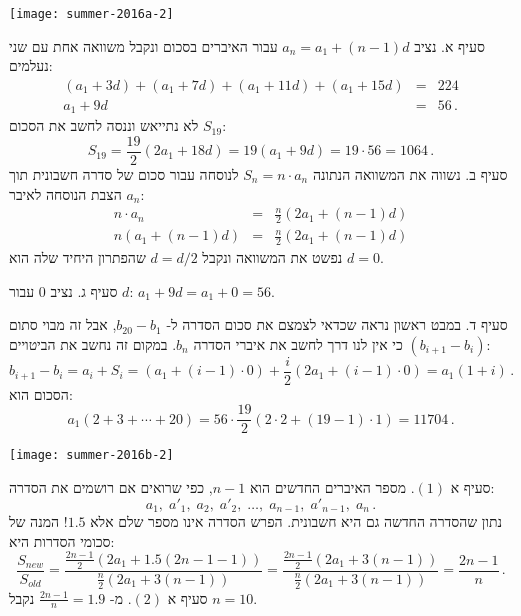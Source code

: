 \begin{center}
\texttt{[image: summer-2016a-2]}
\end{center}
\vspace{-2ex}
סעיף א. נציב
$a_n=a_1+(n-1)d$
עבור האיברים בסכום ונקבל משוואה אחת עם שני נעלמים:
\begin{eqnarray*}
(a_1+3d)+(a_1+7d)+(a_1+11d)+(a_1+15d)&=&224\\
a_1+9d&=&56\,.
\end{eqnarray*}
לא נתייאש וננסה לחשב את הסכום
$S_{19}$:
\[
S_{19}=\frac{19}{2}(2a_1+18d) = 19(a_1+9d)=19\cdot 56 = 1064\,.
\]
סעיף ב. נשווה את המשוואה הנתונה
$S_n=n\cdot a_n$
לנוסחה עבור סכום של סדרה חשבונית תוך הצבת הנוסחה לאיבר
$a_n$:
\begin{eqnarray*}
n\cdot a_n &=& \frac{n}{2}(2a_1+(n-1)d)\\
n(a_1+(n-1)d) &=&\frac{n}{2}(2a_1+(n-1)d)
\end{eqnarray*}
נפשט את המשוואה ונקבל 
$d=d/2$
שהפתרון היחיד שלה הוא
$d=0$.

סעיף ג. נציב
$0$
עבור 
$d$:
$a_1+9d=a_1+0=56$.

סעיף ד. במבט ראשון נראה שכדאי לצמצם את סכום הסדרה  ל-%
$b_{20}-b_1$,
אבל זה מבוי סתום כי אין לנו דרך לחשב את איברי הסדרה
$b_n$.
במקום זה נחשב את הביטויים
$(b_{i+1}-b_i)$:
\[
b_{i+1}-b_i=a_i+S_i=(a_1+(i-1)\cdot 0)+\frac{i}{2}(2a_1+(i-1)\cdot 0)=a_1(1+i)\,.
\]
הסכום הוא:
\[
a_1(2+3+\cdots+20)=56\cdot\frac{19}{2}(2\cdot 2 + (19-1)\cdot 1)=11704\,.
\]
\vspace{-4ex}


\bigskip

\textbf{}

\begin{center}
\texttt{[image: summer-2016b-2]}
\end{center}
\vspace{-1ex}
סעיף א
$(1)$.
מספר האיברים החדשים הוא
$n-1$,
כפי שרואים אם רושמים את הסדרה:
\[
a_1,\; a'_1,\; a_2,\; a'_2,\; \ldots,\; a_{n-1},\; a'_{n-1},\; a_n\,.
\]
נתון שהסדרה החדשה גם היא חשבונית. הפרש הסדרה אינו מספר שלם אלא
$1.5$!
המנה של סכומי הסדרות היא:
\[
\frac{S_{\mathit{new}}}{S_{\mathit{old}}}= \frac{\displaystyle\frac{2n-1}{2}(2a_1+1.5(2n-1-1))}{\displaystyle\frac{n}{2}(2a_1+3(n-1))}=\frac{\displaystyle\frac{2n-1}{2}(2a_1+3(n-1))}{\displaystyle\frac{n}{2}(2a_1+3(n-1))}=\frac{2n-1}{n}\,.
\]
סעיף א
$(2)$.
מ-%
$\displaystyle\frac{2n-1}{n}=1.9$
נקבל
$n=10$.

